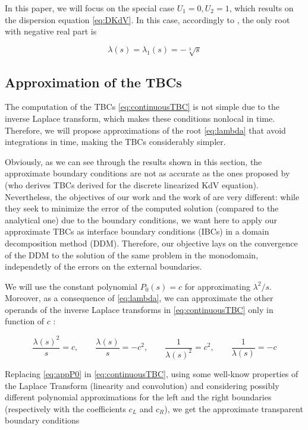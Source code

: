 \indent In this paper, we will focus on the special case $U_1 = 0, U_2 = 1$, which results on the dispersion equation \eqref{eq:DKdV}. In this case, accordingly to \cite{zheng2008}, the only root with negative real part is 

\begin{equation}
	\label{eq:lambda}
			\lambda(s) = \lambda_1(s) =  -\sqrt[3]{s} 
\end{equation}

\subsection{Approximation of the TBCs}

\indent The computation of the TBCs \eqref{eq:continuousTBC} is not simple due to the inverse Laplace transform, which makes these conditions nonlocal in time. Therefore, we will propose approximations of the root \eqref{eq:lambda} that avoid integrations in time, making the TBCs considerably simpler.

\indent Obviously, as we can see through the results shown in this section, the approximate boundary conditions are not as accurate as the ones proposed by \cite{besse2015} (who derives TBCs derived for the discrete linearized KdV equation). Nevertheless, the objectives of our work and the work of \cite{besse2015} are very different: while they seek to minimize the error of the computed solution (compared to the analytical one) due to the boundary conditions, we want here to apply our approximate TBCs as interface boundary conditions (IBCs) in a domain decomposition method (DDM). Therefore, our objective lays on the convergence of the DDM to the solution of the same problem in the monodomain, independetly of the errors on the external boundaries. 

\indent We will use the constant polynomial $P_0(s) = c$ for approximating $\lambda^2/s$. Moreover, as a consequence of \eqref{eq:lambda}, we can approximate the other operands of the inverse Laplace transforms in \eqref{eq:continuousTBC} only in function of $c$ :

\begin{equation}
	\label{eq:appP0}
	\frac{\lambda(s)^2}{s}  = c, \qquad
	\frac{\lambda(s)}{s}  = -c^2, \qquad
	\frac{1}{\lambda(s)^2}  = c^2, \qquad 
	 \frac{1}{\lambda(s)}  = -c 
\end{equation}

\indent Replacing \eqref{eq:appP0} in \eqref{eq:continuousTBC}, using some well-know properties of the Laplace Transform (linearity and convolution) and considering possibly different polynomial approximations for the left and the right boundaries (respectively with the coefficients $c_L$ and $c_R$), we get the approximate transparent boundary conditions


